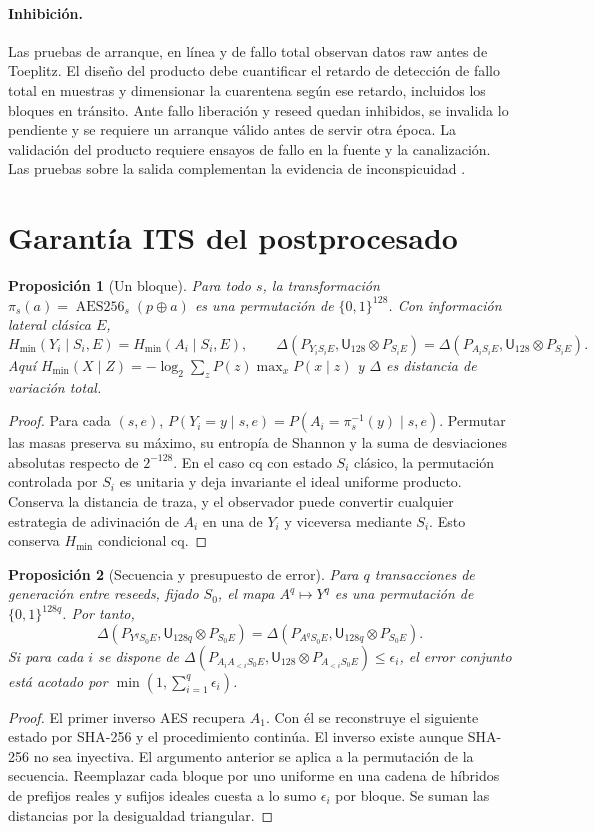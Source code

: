 \documentclass[11pt,a4paper]{article}
\newtheorem{proposition}{Proposición}
\newcommand{\bits}{\{0,1\}}
\newcommand{\hm}{H_{\min}}
\newcommand{\ud}{\mathsf U}
\newcommand{\dist}{\Delta}
\newcommand{\AES}{\operatorname{AES256}}
\begin{document}
\paragraph{Inhibición.}
Las pruebas de arranque, en línea y de fallo total observan datos raw
antes de Toeplitz. El diseño del producto debe cuantificar el retardo de detección de fallo
total en muestras y dimensionar la cuarentena según ese retardo, incluidos
los bloques en tránsito. Ante fallo liberación y reseed quedan inhibidos, se invalida lo
pendiente y se requiere un arranque válido antes de servir otra época.
La validación del producto requiere ensayos de fallo en la fuente y la
canalización. Las pruebas sobre la salida complementan la evidencia de
inconspicuidad \cite[§§308--312, 326, 367 y 375]{ais}.

\section{Garantía ITS del postprocesado}

\begin{proposition}[Un bloque]
Para todo $s$, la transformación $\pi_s(a)=\AES_s(p\oplus a)$ es una
permutación de $\bits^{128}$. Con información lateral clásica $E$,
\[
\hm(Y_i\mid S_i,E)=\hm(A_i\mid S_i,E),\qquad
\dist(P_{Y_i S_i E},\ud_{128}\otimes P_{S_iE})
=\dist(P_{A_i S_i E},\ud_{128}\otimes P_{S_iE}).
\]
Aquí $\hm(X\mid Z)=-\log_2\sum_z P(z)\max_xP(x\mid z)$ y
$\dist$ es distancia de variación total.
\end{proposition}
\begin{proof}
Para cada $(s,e)$, $P(Y_i=y\mid s,e)=P(A_i=\pi_s^{-1}(y)\mid s,e)$.
Permutar las masas preserva su máximo, su entropía de Shannon y la suma de
desviaciones absolutas respecto de $2^{-128}$. En el caso cq con estado $S_i$
clásico, la permutación controlada por $S_i$ es unitaria y deja invariante el
ideal uniforme producto. Conserva la distancia de traza, y el observador
puede convertir cualquier estrategia de adivinación de $A_i$ en una de $Y_i$
y viceversa mediante $S_i$. Esto conserva $\hm$ condicional cq.
\end{proof}

\begin{proposition}[Secuencia y presupuesto de error]
Para $q$ transacciones de generación entre reseeds, fijado $S_0$, el mapa
$A^q\mapsto Y^q$ es una permutación de $\bits^{128q}$. Por tanto,
\[
\dist(P_{Y^q S_0 E},\ud_{128q}\otimes P_{S_0 E})
=\dist(P_{A^q S_0 E},\ud_{128q}\otimes P_{S_0 E}).
\]
Si para cada $i$ se dispone de
$\dist(P_{A_i A_{<i} S_0 E},\ud_{128}\otimes P_{A_{<i} S_0 E})\le\epsilon_i$,
el error conjunto está acotado por $\min(1,\sum_{i=1}^q\epsilon_i)$.
\end{proposition}
\begin{proof}
El primer inverso AES recupera $A_1$. Con él se reconstruye el siguiente
estado por SHA-256 y el procedimiento continúa. El inverso existe
aunque SHA-256 no sea inyectiva. El argumento anterior se aplica a la
permutación de la secuencia. Reemplazar cada bloque por uno uniforme en una
cadena de híbridos de prefijos reales y sufijos ideales cuesta a lo sumo
$\epsilon_i$ por bloque. Se suman las distancias por la desigualdad triangular.
\end{proof}
\end{document}
